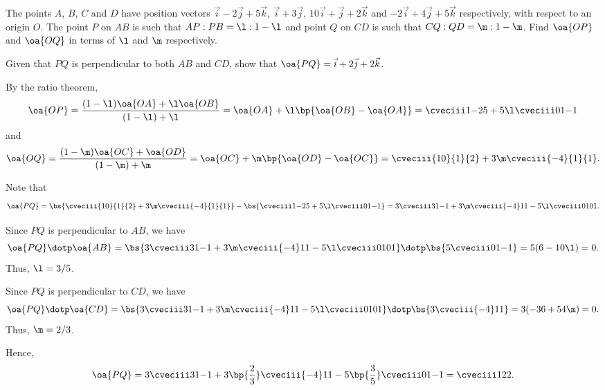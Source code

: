 \begin{problem}
    The points $A$, $B$, $C$ and $D$ have position vectors $\vec i - 2\vec j + 5\vec k$, $\vec i + 3\vec j$, $10\vec i + \vec j + 2\vec k$ and $-2\vec i + 4\vec j + 5\vec k$ respectively, with respect to an origin $O$. The point $P$ on $AB$ is such that $AP : PB = \l : 1 - \l$ and point $Q$ on $CD$ is such that $CQ : QD = \m : 1 - \m$. Find $\oa{OP}$ and $\oa{OQ}$ in terms of $\l$ and $\m$ respectively.

    Given that $PQ$ is perpendicular to both $AB$ and $CD$, show that $\oa{PQ} = \vec i + 2\vec j + 2\vec k$.
\end{problem}
\begin{solution}
    By the ratio theorem, \[\oa{OP} = \frac{(1 - \l) \oa{OA} + \l \oa{OB}}{(1 - \l) + \l} = \oa{OA} + \l \bp{\oa{OB} - \oa{OA}} = \cveciii1{-2}5 + 5\l \cveciii01{-1}\] and \[\oa{OQ} = \frac{(1-\m) \oa{OC} + \oa{OD}}{(1-\m) + \m} = \oa{OC} + \m \bp{\oa{OD} - \oa{OC}} = \cveciii{10}{1}{2} + 3\m \cveciii{-4}{1}{1}.\]

    Note that \[\oa{PQ} = \bs{\cveciii{10}{1}{2} + 3\m \cveciii{-4}{1}{1}} - \bs{\cveciii1{-2}5 + 5\l \cveciii01{-1}} = 3\cveciii31{-1} + 3\m \cveciii{-4}11 - 5\l \cveciii01{01}.\]

    Since $PQ$ is perpendicular to $AB$, we have \[\oa{PQ} \dotp \oa{AB} = \bs{3\cveciii31{-1} + 3\m \cveciii{-4}11 - 5\l \cveciii01{01}} \dotp \bs{5\cveciii01{-1}} = 5(6 -10 \l) = 0.\] Thus, $\l = 3/5$.

    Since $PQ$ is perpendicular to $CD$, we have \[\oa{PQ} \dotp \oa{CD} = \bs{3\cveciii31{-1} + 3\m \cveciii{-4}11 - 5\l \cveciii01{01}} \dotp \bs{3\cveciii{-4}11} = 3(-36 + 54\m) = 0.\] Thus, $\m = 2/3$.

    Hence, \[\oa{PQ} = 3\cveciii31{-1} + 3\bp{\frac23} \cveciii{-4}11 - 5\bp{\frac35} \cveciii01{-1} = \cveciii122.\]
\end{solution}

